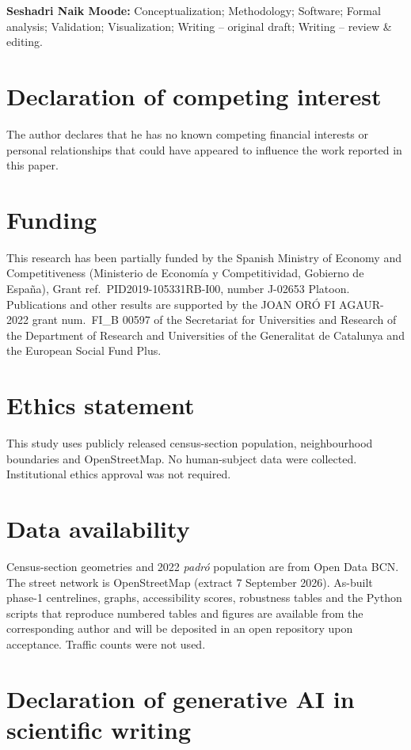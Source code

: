 \documentclass[a4paper,fleqn]{cas-dc}
\begin{document}
\noindent\textbf{Seshadri Naik Moode:} Conceptualization; Methodology;
Software; Formal analysis; Validation; Visualization; Writing -- original
draft; Writing -- review \& editing.

\section*{Declaration of competing interest}

The author declares that he has no known competing financial interests or
personal relationships that could have appeared to influence the work reported
in this paper.

\section*{Funding}

This research has been partially funded by the Spanish Ministry of Economy
and Competitiveness (Ministerio de Econom\'{i}a y Competitividad, Gobierno
de Espa\~{n}a), Grant ref.\ PID2019-105331RB-I00, number J-02653 Platoon.
Publications and other results are supported by the JOAN OR\'{O} FI
AGAUR-2022 grant num.\ FI\_B 00597 of the Secretariat for Universities and
Research of the Department of Research and Universities of the Generalitat
de Catalunya and the European Social Fund Plus.

\section*{Ethics statement}

This study uses publicly released census-section population, neighbourhood
boundaries and OpenStreetMap. No human-subject data were collected.
Institutional ethics approval was not required.

\section*{Data availability}

Census-section geometries and 2022 \emph{padr\'o} population are from Open
Data BCN. The street network is OpenStreetMap (extract 7 September 2026).
As-built phase-1 centrelines, graphs, accessibility scores, robustness
tables and the Python scripts that reproduce numbered tables and figures are
available from the corresponding author and will be deposited in an open
repository upon acceptance. Traffic counts were not used.

\section*{Declaration of generative AI in scientific writing}
\end{document}
